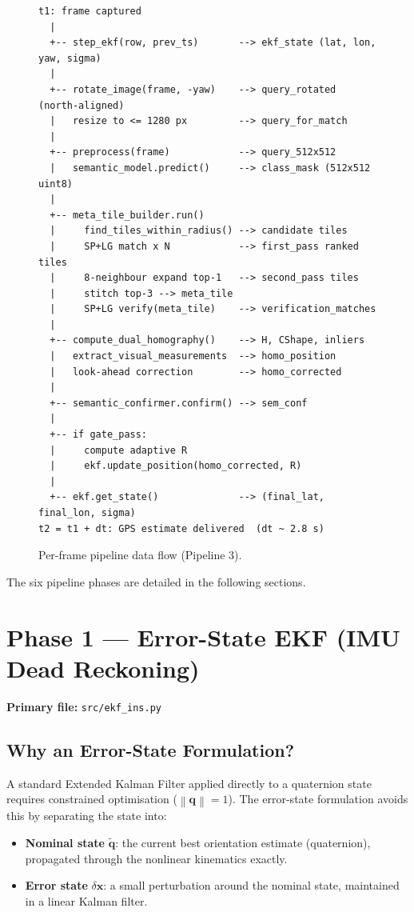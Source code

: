\documentclass[12pt,a4paper]{article}
\newcommand{\norm}[1]{\left\lVert#1\right\rVert}
\newcommand{\bx}{\mathbf{x}}
\newcommand{\bq}{\mathbf{q}}
\begin{document}
\begin{figure}[H]
\centering
\begin{minipage}{0.82\textwidth}
\begin{verbatim}
t1: frame captured
  |
  +-- step_ekf(row, prev_ts)       --> ekf_state (lat, lon, yaw, sigma)
  |
  +-- rotate_image(frame, -yaw)    --> query_rotated  (north-aligned)
  |   resize to <= 1280 px         --> query_for_match
  |
  +-- preprocess(frame)            --> query_512x512
  |   semantic_model.predict()     --> class_mask (512x512 uint8)
  |
  +-- meta_tile_builder.run()
  |     find_tiles_within_radius() --> candidate tiles
  |     SP+LG match x N            --> first_pass ranked tiles
  |     8-neighbour expand top-1   --> second_pass tiles
  |     stitch top-3 --> meta_tile
  |     SP+LG verify(meta_tile)    --> verification_matches
  |
  +-- compute_dual_homography()    --> H, CShape, inliers
  |   extract_visual_measurements  --> homo_position
  |   look-ahead correction        --> homo_corrected
  |
  +-- semantic_confirmer.confirm() --> sem_conf
  |
  +-- if gate_pass:
  |     compute adaptive R
  |     ekf.update_position(homo_corrected, R)
  |
  +-- ekf.get_state()              --> (final_lat, final_lon, sigma)
t2 = t1 + dt: GPS estimate delivered  (dt ~ 2.8 s)
\end{verbatim}
\end{minipage}
\caption{Per-frame pipeline data flow (Pipeline 3).}
\end{figure}

\noindent The six pipeline phases are detailed in the following sections.

\section{Phase 1 --- Error-State EKF (IMU Dead Reckoning)}

\noindent\textbf{Primary file:} \texttt{src/ekf\_ins.py}

\subsection{Why an Error-State Formulation?}

A standard Extended Kalman Filter applied directly to a quaternion state requires
constrained optimisation ($\norm{\bq} = 1$). The error-state formulation avoids
this by separating the state into:
\begin{itemize}
    \item \textbf{Nominal state} $\tilde{\bq}$: the current best orientation
          estimate (quaternion), propagated through the nonlinear kinematics
          exactly.
    \item \textbf{Error state} $\delta\bx$: a small perturbation around the
          nominal state, maintained in a linear Kalman filter.
\end{itemize}
\end{document}
